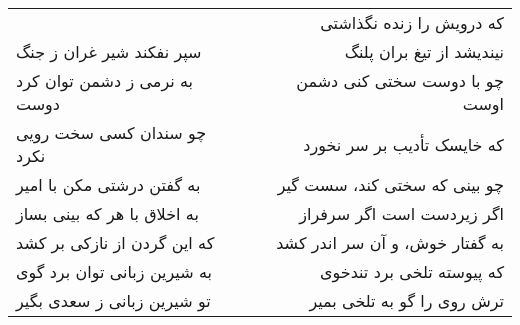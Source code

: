 \begin{center}
\begin{longtable}{l p{0.5cm} r}
&&
که درویش را زنده نگذاشتی
\\
سپر نفکند شیر غران ز جنگ
&&
نیندیشد از تیغ بران پلنگ
\\
به نرمی ز دشمن توان کرد دوست
&&
چو با دوست سختی کنی دشمن اوست
\\
چو سندان کسی سخت رویی نکرد
&&
که خایسک تأدیب بر سر نخورد
\\
به گفتن درشتی مکن با امیر
&&
چو بینی که سختی کند، سست گیر
\\
به اخلاق با هر که بینی بساز
&&
اگر زیردست است اگر سرفراز
\\
که این گردن از نازکی بر کشد
&&
به گفتار خوش، و آن سر اندر کشد
\\
به شیرین زبانی توان برد گوی
&&
که پیوسته تلخی برد تندخوی
\\
تو شیرین زبانی ز سعدی بگیر
&&
ترش روی را گو به تلخی بمیر
\\
\end{longtable}
\end{center}
